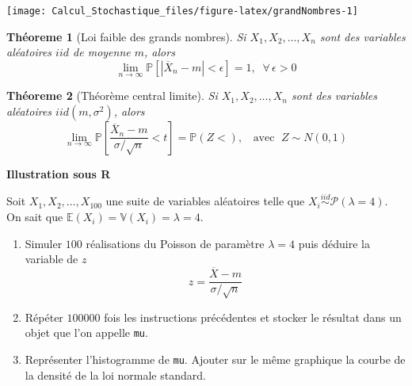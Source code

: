 \documentclass[
]{book}
\newtheorem{theorem}{Théoreme}[chapter]
\theoremstyle{definition}
\theoremstyle{definition}
\theoremstyle{definition}
\theoremstyle{remark}
\begin{document}
\begin{center}\texttt{[image: Calcul\_Stochastique\_files/figure-latex/grandNombres-1]} \end{center}

\begin{theorem}[Loi faible des grands nombres]
\protect\hypertarget{thm:unnamed-chunk-33}{}{\label{thm:unnamed-chunk-33} {} }Si \(X_1,X_2,\ldots, X_n\) sont des variables aléatoires \(iid\) de moyenne \(m\), alors
\[
\lim_{n \rightarrow \infty}\mathbb{P}\left[|\overline{X}_n-m| < \epsilon \right]=1, \;\; \forall \, \epsilon > 0
\]
\end{theorem}

\begin{theorem}[Théorème central limite]
\protect\hypertarget{thm:unnamed-chunk-34}{}{\label{thm:unnamed-chunk-34} {} }Si \(X_1,X_2,\ldots, X_n\) sont des variables aléatoires \(iid(m,\sigma^2)\), alors
\[
\lim_{n \rightarrow \infty}\mathbb{P}\left[\frac{\overline{X}_n-m}{\sigma/\sqrt{n}} < t \right]=\mathbb{P}(Z <), \;\; \text{ avec } \; Z \sim N(0,1)
\]
\end{theorem}

\textbf{Illustration sous R}

Soit \(X_1, X_2,\ldots, X_{100}\) une suite de variables aléatoires telle que \(X_i \stackrel{iid}{\sim}\mathcal{P(\lambda=4)}\). On sait que \(\mathbb{E}(X_i)=\mathbb{V}(X_i)=\lambda=4\).

\begin{enumerate}
\def\labelenumi{\arabic{enumi}.}
\item
  Simuler \(100\) réalisations du Poisson de paramètre \(\lambda=4\) puis déduire la variable de \(z\)
  \[z=\dfrac{\overline{X}-m}{\sigma/\sqrt{n}} \]
\item
  Répéter \(100000\) fois les instructions précédentes et stocker le résultat dans un objet que l'on appelle \texttt{mu}.
\item
  Représenter l'histogramme de \texttt{mu}. Ajouter sur le même graphique la courbe de la densité de la loi normale standard.
\end{enumerate}
\end{document}
